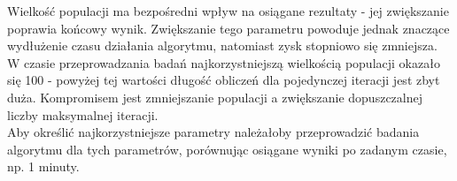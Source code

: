 Wielkość populacji ma bezpośredni wpływ na osiągane rezultaty - jej zwiększanie poprawia końcowy wynik. Zwiększanie tego parametru powoduje jednak znaczące wydłużenie czasu działania algorytmu, natomiast zysk stopniowo się zmniejsza. W czasie przeprowadzania badań najkorzystniejszą wielkością populacji okazało się 100 - powyżej tej wartości długość obliczeń dla pojedynczej iteracji jest zbyt duża. Kompromisem jest  zmniejszanie populacji a zwiększanie dopuszczalnej liczby maksymalnej iteracji. \\
Aby określić najkorzystniejsze parametry należałoby przeprowadzić badania algorytmu dla tych parametrów, porównując osiągane wyniki po zadanym czasie, np. 1 minuty.


